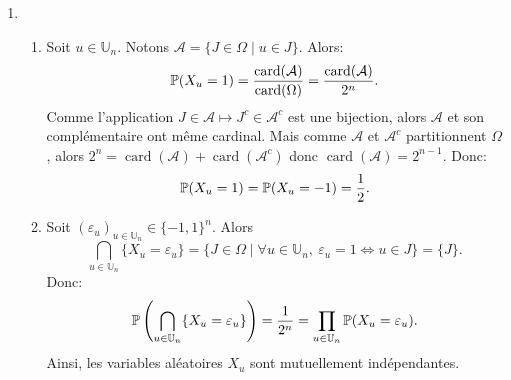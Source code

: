 \begin{enumerate}
 \item \begin{enumerate}
            \item Soit $u\in \mathbb{U}_{n}$. Notons $\mathcal{A} = \{ J\in \Omega \mid u\in J\}$. Alors:
            \[\mathbb{P}(X_{u} = 1) = \frac{\operatorname{card}(\mathcal{A})}{\operatorname{card}(\Omega)} = \frac{\operatorname{card}(\mathcal{A})}{2^{n}}.\]
            Comme l'application $J\in \mathcal{A} \mapsto J^{c}\in \mathcal{A}^{c}$ est une bijection, alors $\mathcal{A}$ et son complémentaire ont même cardinal. Mais comme $\mathcal{A}$ et $\mathcal{A}^{c}$ partitionnent $\Omega$, alors $2^{n} = \operatorname{card}(\mathcal{A}) + \operatorname{card}(\mathcal{A}^{c})$ donc $\operatorname{card}(\mathcal{A}) = 2^{n-1}$. Donc:
            \[ \mathbb{P}(X_{u} = 1) = \mathbb{P}(X_{u} = -1) = \frac{1}{2}.\]
            \item Soit $(\varepsilon_{u})_{u\in \mathbb{U}_{n}}\in \{ -1, 1\}^{n}$. Alors
            \[ \bigcap_{u\in \mathbb{U}_{n}}\{X_{u} = \varepsilon_{u}\} = \{ J\in \Omega \mid \forall u\in \mathbb{U}_{n},\ \varepsilon_{u} = 1 \Longleftrightarrow u\in J\} = \{J\}.\]
            Donc:
            \[\mathbb{P}\left ( \bigcap_{u\in \mathbb{U}_{n}}\{ X_{u} = \varepsilon_{u}\}\right ) = \frac{1}{2^{n}} = \prod_{u\in \mathbb{U}_{n}}\mathbb{P}(X_{u} = \varepsilon_{u}). \]
            Ainsi, les variables aléatoires $X_{u}$ sont mutuellement indépendantes.
           \end{enumerate}
           

\end{enumerate}
